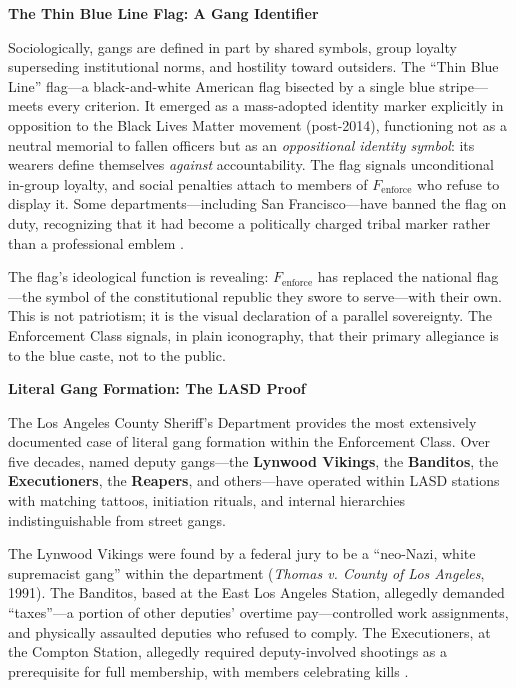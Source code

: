 \documentclass[12pt,openany]{book}
\begin{document}
\textbf{The Thin Blue Line Flag: A Gang Identifier}

Sociologically, gangs are defined in part by shared symbols, group loyalty superseding institutional norms, and hostility toward outsiders. The ``Thin Blue Line'' flag---a black-and-white American flag bisected by a single blue stripe---meets every criterion. It emerged as a mass-adopted identity marker explicitly in opposition to the Black Lives Matter movement (post-2014), functioning not as a neutral memorial to fallen officers but as an \textit{oppositional identity symbol}: its wearers define themselves \textit{against} accountability. The flag signals unconditional in-group loyalty, and social penalties attach to members of $F_{\text{enforce}}$ who refuse to display it. Some departments---including San Francisco---have banned the flag on duty, recognizing that it had become a politically charged tribal marker rather than a professional emblem \cite{skolnick}.

The flag's ideological function is revealing: $F_{\text{enforce}}$ has replaced the national flag---the symbol of the constitutional republic they swore to serve---with their own. This is not patriotism; it is the visual declaration of a parallel sovereignty. The Enforcement Class signals, in plain iconography, that their primary allegiance is to the blue caste, not to the public.

\textbf{Literal Gang Formation: The LASD Proof}

The Los Angeles County Sheriff's Department provides the most extensively documented case of literal gang formation within the Enforcement Class. Over five decades, named deputy gangs---the \textbf{Lynwood Vikings}, the \textbf{Banditos}, the \textbf{Executioners}, the \textbf{Reapers}, and others---have operated within LASD stations with matching tattoos, initiation rituals, and internal hierarchies indistinguishable from street gangs.

The Lynwood Vikings were found by a federal jury to be a ``neo-Nazi, white supremacist gang'' within the department (\textit{Thomas v. County of Los Angeles}, 1991). The Banditos, based at the East Los Angeles Station, allegedly demanded ``taxes''---a portion of other deputies' overtime pay---controlled work assignments, and physically assaulted deputies who refused to comply. The Executioners, at the Compton Station, allegedly required deputy-involved shootings as a prerequisite for full membership, with members celebrating kills \cite{lacoversight}.
\end{document}
